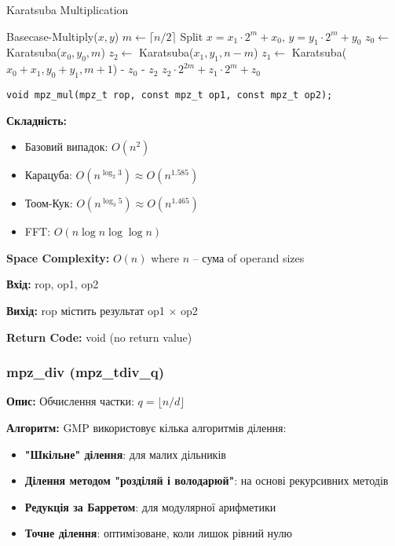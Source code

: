 \newpage 
\begin{algorithm}
    \caption{Karatsuba Multiplication}
    \begin{algorithmic}[1]
        \State \Return Basecase-Multiply($x, y$)
        \EndIf
        \State $m \gets \lceil n/2 \rceil$
        \State Split $x = x_{1} \cdot 2^{m} + x_{0}$, $y = y_{1} \cdot 2^{m} + y_{0}$
        \State $z_{0} \gets$ Karatsuba($x_{0}, y_{0}, m$)
        \State $z_{2} \gets$ Karatsuba($x_{1}, y_{1}, n-m$)
        \State $z_{1} \gets$ Karatsuba($x_{0}+x_{1}, y_{0}+y_{1}, m+1$) - $z_{0}$ - $z_{2}$
        \State \Return $z_{2} \cdot 2^{2m} + z_{1} \cdot 2^{m} + z_{0}$
        \EndFunction
    \end{algorithmic}
\end{algorithm}

\begin{verbatim}
void mpz_mul(mpz_t rop, const mpz_t op1, const mpz_t op2);
\end{verbatim}

\textbf{Складність:}
\begin{itemize}
    \item Базовий випадок: $O(n^{2})$
    \item Карацуба: $O(n^{\log_{2} 3}) \approx O(n^{1.585})$
    \item Тоом-Кук: $O(n^{\log_3 5}) \approx O(n^{1.465})$
    \item FFT: $O(n \log n \log \log n)$
\end{itemize}

\textbf{Space Complexity:} $O(n)$ where $n$ -- сума of operand sizes

\textbf{Вхід:} rop, op1, op2

\textbf{Вихід:} rop містить результат op1 $\times$ op2

\textbf{Return Code:} void (no return value)

\subsubsection{mpz\_div (mpz\_tdiv\_q)}
\textbf{Опис:} Обчислення частки: $q = \lfloor n/d \rfloor$

\textbf{Алгоритм:} GMP використовує кілька алгоритмів ділення:
\begin{itemize}
    \item \textbf{"Шкільне"{} ділення}: для малих дільників
    \item \textbf{Ділення методом "розділяй і володарюй"{}}: на основі рекурсивних методів
    \item \textbf{Редукція за Барретом}: для модулярної арифметики
    \item \textbf{Точне ділення}: оптимізоване, коли лишок рівний нулю
\end{itemize}

